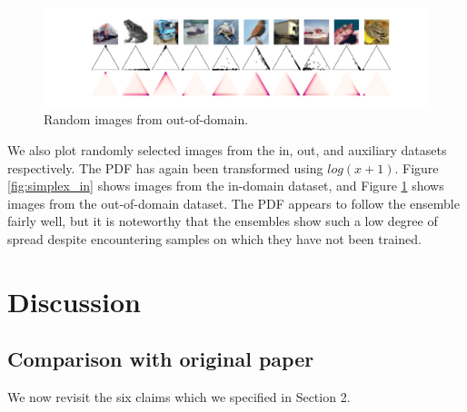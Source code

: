 \begin{figure}[H]
    \centering
    \includegraphics[trim = 0 0 0 20, clip, width = 1\linewidth]{../openreview/plots/simplex_out.png}
    \caption{Random images from out-of-domain.}
    \label{fig:simplex_out}
\end{figure}

We also plot randomly selected images from the in, out, and auxiliary datasets respectively. The PDF has again been transformed using $log(x + 1)$. Figure \ref{fig:simplex_in} shows images from the in-domain dataset, and Figure \ref{fig:simplex_out} shows images from the out-of-domain dataset. The PDF appears to follow the ensemble fairly well, but it is noteworthy that the ensembles show such a low degree of spread despite encountering samples on which they have not been trained. 




\section{Discussion}
\label{sec:discussion}

\subsection{Comparison with original paper}

We now revisit the six claims which we specified in Section 2.

